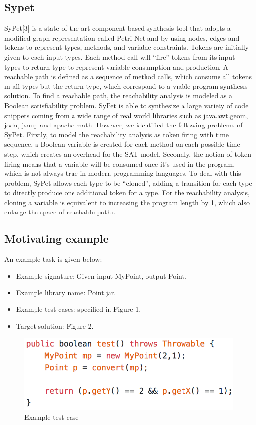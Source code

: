 \documentclass[twocolumn]{article}
\begin{document}
\subsection{Sypet}
SyPet[3] is a state-of-the-art component based synthesis tool that adopts a modified graph representation called Petri-Net and by using nodes, edges and tokens to represent types, methods, and variable constraints. Tokens are initially given to each input types. Each method call will “fire” tokens from its input types to return type to represent variable consumption and production. A reachable path is defined as a sequence of method calls, which consume all tokens in all types but the return type, which correspond to a viable program synthesis solution. To find a reachable path, the reachability analysis is modeled as a Boolean satisfiability problem. SyPet is able to synthesize a large variety of code snippets coming from a wide range of real world libraries such as java.awt.geom, joda, jsoup and apache math. However, we identified the following problems of SyPet. Firstly, to model the reachability analysis as token firing with time sequence, a Boolean variable is created for each method on each possible time step, which creates an overhead for the SAT model. Secondly, the notion of token firing means that a variable will be consumed once it’s used in the program, which is not always true in modern programming languages. To deal with this problem, SyPet allows each type to be “cloned”, adding a transition for each type to directly produce one additional token for a type. For the reachability analysis, cloning a variable is equivalent to increasing the program length by 1, which also enlarge the space of reachable paths.
\subsection{Motivating example}
An example task is given below:
\begin{itemize}
    \item Example signature: Given input MyPoint, output Point.
    \item Example library name: Point.jar.
    \item Example test cases: specified in Figure 1.
    \item Target solution: Figure 2.
\end{itemize}
\begin{figure}[h]
\centering
\includegraphics[scale = 0.65]{testcase.png}
\caption{Example test case}
\end{figure}
\end{document}
